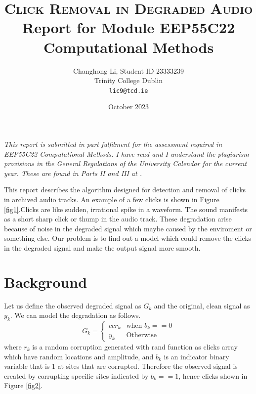 \documentclass[11pt, a4paper]{article}
\begin{document}
\title{\textbf{\textsc{\Huge Click Removal in Degraded Audio}}\\ {\Large Report for Module EEP55C22 Computational Methods}}
\author{Changhong Li, Student ID 23333239 \\ Trinity College Dublin \\ {\tt lic9@tcd.ie}}

\date{October 2023}

\maketitle

\begin{center}
\begin{minipage}[t]{0.75\linewidth}
\textit{
This report is submitted in part fulfilment for the assessment required in EEP55C22 Computational Methods.  I have read and I understand the plagiarism provisions in the General Regulations of the University Calendar for the current year. These are found in Parts II and III at .}
\end{minipage}
\end{center}

This report describes the algorithm designed for detection and removal of clicks in archived audio tracks. An example of a few clicks is shown in Figure \ref{fig1}.Clicks are like sudden, irrational spike in a waveform. The sound manifests as a short sharp click or thump in the audio track. These degradation arise because of noise in the degraded signal which maybe caused by the enviroment or something else. Our problem is to find out a model which could remove the clicks in the degraded signal and make the output signal more smooth.




\section{Background}
Let us define the observed degraded signal as $G_k$ and the original, clean signal as $y_k$. 
We can model the degradation as follows.
\begin{equation}
  G_k = \begin{cases}{cc}
              r_k & \text{when $b_k == 0$} \\
              y_k & \text{Otherwise}
              \end{cases}
\end{equation}
 where $r_k$ is a random corruption generated with rand function as clicks array which have random locations and amplitude, and $b_k$ is an indicator binary variable that is 1 at sites that are corrupted. Therefore the observed signal is created by corrupting specific sites indicated by $b_k == 1$, hence clicks shown in Figure \ref{fig2}.
      
\end{document}
